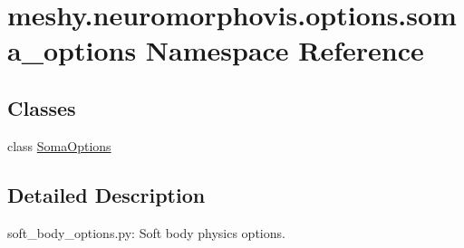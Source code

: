 \hypertarget{namespacemeshy_1_1neuromorphovis_1_1options_1_1soma__options}{}\section{meshy.\+neuromorphovis.\+options.\+soma\+\_\+options Namespace Reference}
\label{namespacemeshy_1_1neuromorphovis_1_1options_1_1soma__options}
\subsection*{Classes}
\begin{DoxyCompactItemize}
\item 
class \hyperlink{classmeshy_1_1neuromorphovis_1_1options_1_1soma__options_1_1SomaOptions}{Soma\+Options}
\end{DoxyCompactItemize}


\subsection{Detailed Description}
\begin{DoxyVerb}soft_body_options.py:
    Soft body physics options.
\end{DoxyVerb}
 